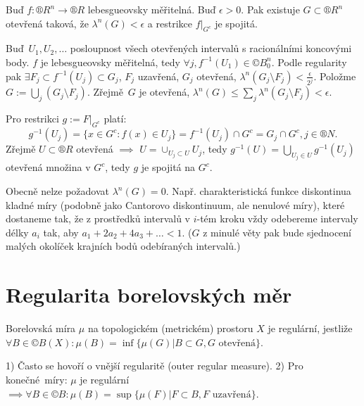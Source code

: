 \documentclass[12pt]{article}					%
\begin{document}
\begin{veta}
	Buď $f: ®R^n \rightarrow ®R$ lebesgueovsky měřitelná. Buď $\epsilon > 0$. Pak existuje $G \subset ®R^n$ otevřená taková, že $\lambda^n(G) < \epsilon$ a restrikce $f|_{G^c}$ je spojitá.

	\begin{dukazin}
		Buď $U_1, U_2, …$ posloupnost všech otevřených intervalů s racionálními koncovými body. $f$ je lebesgueovsky měřitelná, tedy $\forall j, f^{-1}(U_1) \in ©B_0^n$. Podle regularity pak $\exists F_j \subset f^{-1}(U_j) \subset G_j$, $F_j$ uzavřená, $G_j$ otevřená, $\lambda^n(G_j \setminus F_j) < \frac{\epsilon}{2^j}$. Položme $G := \bigcup_j (G_j \setminus F_j)$. Zřejmě $G$ je otevřená, $\lambda^n(G) ≤ \sum_j \lambda^n (G_j \setminus F_j) < \epsilon$.

		Pro restrikci $g := F|_{G^c}$ platí:
		$$ g^{-1}(U_j) = \{x \in G^c: f(x) \in U_j\} = f^{-1}(U_j) \cap G^c = G_j \cap G^c, j \in ®N. $$
		Zřejmě $U \subset ®R$ otevřená $\implies$ $U = \cup_{U_j \subset U} U_j$, tedy $g^{-1}(U) = \bigcup_{U_j \in U}g^{-1}(U_j)$ otevřená množina v $G^c$, tedy $g$ je spojitá na $G^c$.
	\end{dukazin}

	\begin{poznamkain}
		Obecně nelze požadovat $\lambda^n(G) = 0$. Např. charakteristická funkce diskontinua kladné míry (podobně jako Cantorovo diskontinuum, ale nenulové míry), které dostaneme tak, že z prostředků intervalů v $i$-tém kroku vždy odebereme intervaly délky $a_i$ tak, aby $a_1 + 2a_2 + 4a_3 + … < 1$. ($G$ z minulé věty pak bude sjednocení malých okolíček krajních bodů odebíraných intervalů.)
	\end{poznamkain}
\end{veta}

\section{Regularita borelovských měr}
\begin{definice}
	Borelovská míra $\mu$ na topologickém (metrickém) prostoru $X$ je regulární, jestliže $\forall B \in ©B(X): \mu(B) = \inf\{\mu(G) | B \subset G, G \text{ otevřená}\}$.
\end{definice}

\begin{poznamka}
	1) Často se hovoří o vnější regularitě (outer regular measure). 2) Pro konečné míry: $\mu$ je regulární $\implies \forall B \in ©B: \mu(B) = \sup\{\mu(F) | F \subset B, F \text{ uzavřená}\}$.
\end{poznamka}
\end{document}
